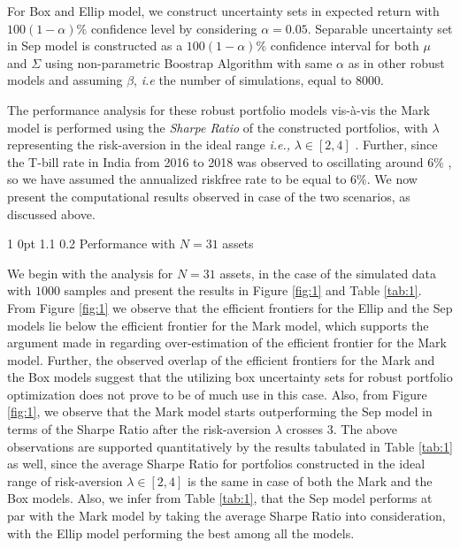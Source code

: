 \documentclass[12pt]{article}
\makeatletter
\numberwithin{equation}{section}
\renewcommand{\subsection}{
  \@startsection
  {subsection}%
  {1}%
  {0pt}%
  {1.1\baselineskip}%
  {0.2\baselineskip}%
  {\sc \centering}%
}
\makeatother
\begin{document}
For Box and Ellip model, we construct uncertainty sets in expected return with $100(1-\alpha)\%$ confidence level by considering $\alpha=0.05$. Separable uncertainty set in Sep model is constructed as a $100(1-\alpha)\%$ confidence interval for both $\mu$ and $\Sigma$ using non-parametric Boostrap Algorithm with same $\alpha$ as in other robust models and assuming $\beta$, \textit{i.e} the number of simulations, equal to $8000$.

The performance analysis for these robust portfolio models vis-\`a-vis the Mark model is performed using the \textit{Sharpe Ratio} of the constructed portfolios, with $\lambda$ representing the risk-aversion in the ideal range \textit{i.e.,} $\lambda \in [2,4]$ \cite{Fabozzi07}. Further, since the T-bill rate in India from 2016 to 2018 was observed to oscillating around $6\%$ \cite{rbi}, so we have assumed the annualized riskfree rate to be equal to $6\%$. We now present the computational results observed in case of the two scenarios, as discussed above.

\subsection{Performance with $N=31$ assets}

We begin with the analysis for $N=31$ assets, in the case of the simulated data with $1000$ samples and present the results in Figure \ref{fig:1} and Table \ref{tab:1}. From Figure \ref{fig:1} we observe that the efficient frontiers for the Ellip and the Sep models lie below the efficient frontier for the Mark model, which  supports the argument made in \cite{Broadie93} regarding over-estimation of the efficient frontier for the Mark model. Further, the observed overlap of the efficient frontiers for the Mark and the Box models suggest that the utilizing box uncertainty sets for robust portfolio optimization does not prove to be of much use in this case. Also, from Figure \ref{fig:1}, we observe that the Mark model starts outperforming the Sep model in terms of the Sharpe Ratio after the risk-aversion $\lambda$ crosses $3$. The above observations are supported quantitatively by the results tabulated in Table \ref{tab:1} as well, since the average Sharpe Ratio for portfolios constructed in the ideal range of risk-aversion $\lambda\in [2,4]$ is the same in case of both the Mark and the Box models. Also, we infer from Table \ref{tab:1}, that the Sep model performs at par with the Mark model by taking the average Sharpe Ratio into consideration, with the Ellip model performing the best among all the models.
\end{document}
